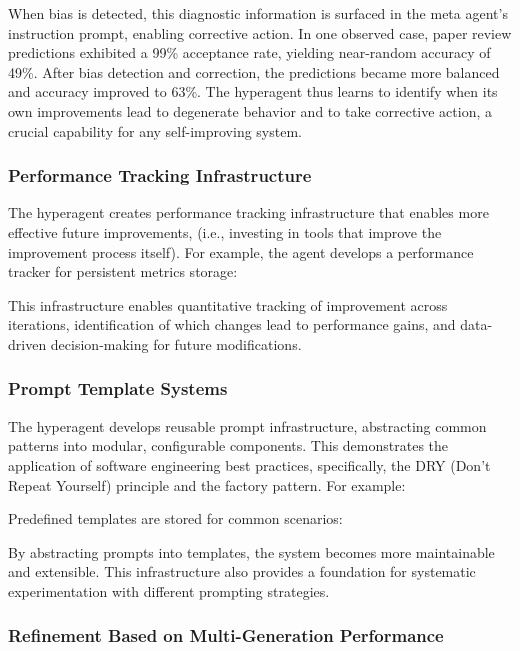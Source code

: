 \documentclass{article}
\begin{document}
When bias is detected, this diagnostic information is surfaced in the meta agent's instruction prompt, enabling corrective action. In one observed case, paper review predictions exhibited a 99\% acceptance rate, yielding near-random accuracy of 49\%. After bias detection and correction, the predictions became more balanced and accuracy improved to 63\%. The hyperagent thus learns to identify when its own improvements lead to degenerate behavior and to take corrective action, a crucial capability for any self-improving system.

\subsubsection{Performance Tracking Infrastructure}

The hyperagent creates performance tracking infrastructure that enables more effective future improvements, (i.e., investing in tools that improve the improvement process itself).
For example, the agent develops a performance tracker for persistent metrics storage:


This infrastructure enables quantitative tracking of improvement across iterations, identification of which changes lead to performance gains, and data-driven decision-making for future modifications.

\subsubsection{Prompt Template Systems}

The hyperagent develops reusable prompt infrastructure, abstracting common patterns into modular, configurable components. This demonstrates the application of software engineering best practices, specifically, the DRY (Don't Repeat Yourself) principle and the factory pattern.
For example:


Predefined templates are stored for common scenarios:


By abstracting prompts into templates, the system becomes more maintainable and extensible. This infrastructure also provides a foundation for systematic experimentation with different prompting strategies.

\subsubsection{Refinement Based on Multi-Generation Performance}
\end{document}
